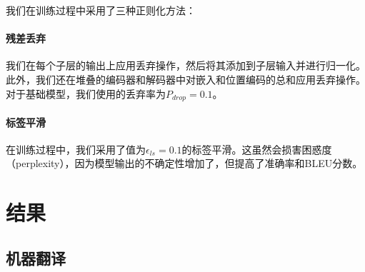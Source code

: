 \documentclass[lang=cn,a4paper,newtx]{elegantpaper}
\begin{document}
我们在训练过程中采用了三种正则化方法：
\paragraph{残差丢弃} 我们在每个子层的输出上应用丢弃操作，然后将其添加到子层输入并进行归一化。此外，我们还在堆叠的编码器和解码器中对嵌入和位置编码的总和应用丢弃操作。对于基础模型，我们使用的丢弃率为$P_{drop}=0.1$。

\paragraph{标签平滑} 在训练过程中，我们采用了值为$\epsilon_{ls}=0.1$的标签平滑。这虽然会损害困惑度（perplexity），因为模型输出的不确定性增加了，但提高了准确率和BLEU分数。

\section{结果} \label{sec:results}

\subsection{机器翻译}
\end{document}
